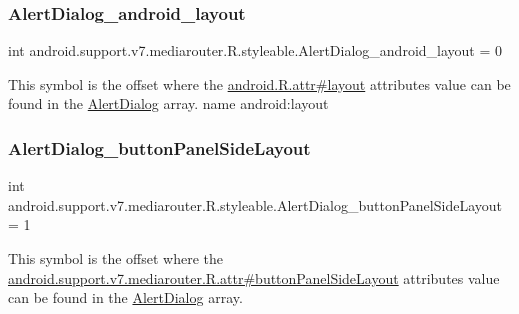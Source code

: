 \subsubsection{\texorpdfstring{Alert\+Dialog\+\_\+android\+\_\+layout}{AlertDialog\_android\_layout}}
{\footnotesize\ttfamily int android.\+support.\+v7.\+mediarouter.\+R.\+styleable.\+Alert\+Dialog\+\_\+android\+\_\+layout = 0\hspace{0.3cm}{\ttfamily [static]}}

This symbol is the offset where the \hyperlink{}{android.\+R.\+attr\#layout} attribute\textquotesingle{}s value can be found in the \hyperlink{classandroid_1_1support_1_1v7_1_1mediarouter_1_1R_1_1styleable_a2c8307beccb0eb2a93adf87cab8ef939}{Alert\+Dialog} array.  name android\+:layout \mbox{\label{classandroid_1_1support_1_1v7_1_1mediarouter_1_1R_1_1styleable_ac63bd50a2885305595427ff4a1a5ee17}} 
\subsubsection{\texorpdfstring{Alert\+Dialog\+\_\+button\+Panel\+Side\+Layout}{AlertDialog\_buttonPanelSideLayout}}
{\footnotesize\ttfamily int android.\+support.\+v7.\+mediarouter.\+R.\+styleable.\+Alert\+Dialog\+\_\+button\+Panel\+Side\+Layout = 1\hspace{0.3cm}{\ttfamily [static]}}

This symbol is the offset where the \hyperlink{classandroid_1_1support_1_1v7_1_1mediarouter_1_1R_1_1attr_a2be1cd23c0ba57efce6daa640927dc7b}{android.\+support.\+v7.\+mediarouter.\+R.\+attr\#button\+Panel\+Side\+Layout} attribute\textquotesingle{}s value can be found in the \hyperlink{classandroid_1_1support_1_1v7_1_1mediarouter_1_1R_1_1styleable_a2c8307beccb0eb2a93adf87cab8ef939}{Alert\+Dialog} array.

